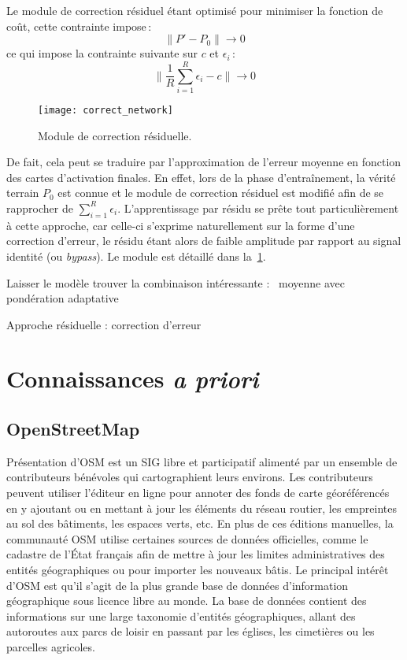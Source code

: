 Le module de correction résiduel étant optimisé pour minimiser la fonction de coût, cette contrainte impose\,:
\begin{equation}
\lVert P' - P_0 \rVert \rightarrow 0
\end{equation}
ce qui impose la contrainte suivante sur $c$ et $\epsilon_i$\,:
\begin{equation}
\lVert \frac{1}{R} \sum_{i=1}^R \epsilon_i - c \rVert \rightarrow 0
\end{equation}

\begin{figure}[t]
  \texttt{[image: correct\_network]}
  \caption{Module de correction résiduelle.}
  \label{fig:correction_network}
\end{figure}

De fait, cela peut se traduire par l'approximation de l'erreur moyenne en fonction des cartes d'activation finales. En effet, lors de la phase d'entraînement, la vérité terrain $P_0$ est connue et le module de correction résiduel est modifié afin de se rapprocher de $\sum_{i=1}^R \epsilon_i$. L'apprentissage par résidu se prête tout particulièrement à cette approche, car celle-ci s'exprime naturellement sur la forme d'une correction d'erreur, le résidu étant alors de faible amplitude par rapport au signal identité (ou \emph{bypass}). Le module est détaillé dans la~\cref{fig:correction_network}.

Laisser le modèle trouver la combinaison intéressante : ~moyenne avec pondération adaptative

Approche résiduelle : correction d'erreur

\section{Connaissances \textit{a priori}}

\subsection{OpenStreetMap}

Présentation d'OSM
 est un \gls{SIG} libre et participatif alimenté par un ensemble de contributeurs bénévoles qui cartographient leurs environs. Les contributeurs peuvent utiliser l'éditeur en ligne pour annoter des fonds de carte géoréférencés en y ajoutant ou en mettant à jour les éléments du réseau routier, les empreintes au sol des bâtiments, les espaces verts, etc. En plus de ces éditions manuelles, la communauté \gls{OSM} utilise certaines sources de données officielles, comme le cadastre de l'État français afin de mettre à jour les limites administratives des entités géographiques ou pour importer les nouveaux bâtis. Le principal intérêt d'\gls{OSM} est qu'il s'agit de la plus grande base de données d'information géographique sous licence libre au monde. La base de données contient des informations sur une large taxonomie d'entités géographiques, allant des autoroutes aux parcs de loisir en passant par les églises, les cimetières ou les parcelles agricoles.

